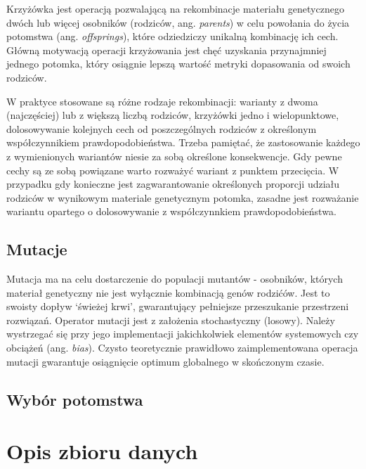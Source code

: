 \documentclass[a4paper,11pt]{article}
\begin{document}
    Krzyżówka jest operacją pozwalającą na rekombinacje materiału genetycznego dwóch lub więcej osobników (rodziców, ang. \textit{parents}) w celu powołania do życia potomstwa (ang. \textit{offsprings}), które odziedziczy unikalną kombinację ich cech. Główną motywacją operacji krzyżowania jest chęć uzyskania przynajmniej jednego potomka, który osiągnie lepszą wartość metryki dopasowania od swoich rodziców\cite{GeneticAlgorithmEssentials2017}.

    \bigskip

    W praktyce stosowane są różne rodzaje rekombinacji: warianty z dwoma (najczęściej) lub z większą liczbą rodziców, krzyżówki jedno i wielopunktowe, dolosowywanie kolejnych cech od poszczególnych rodziców z określonym współczynnikiem prawdopodobieństwa. Trzeba pamiętać, że zastosowanie każdego z wymienionych wariantów niesie za sobą określone konsekwencje. Gdy pewne cechy są ze sobą powiązane warto rozważyć wariant z punktem przecięcia. W przypadku gdy konieczne jest zagwarantowanie określonych proporcji udziału rodziców w wynikowym materiale genetycznym potomka, zasadne jest rozważanie wariantu opartego o dolosowywanie z współczynnkiem prawdopodobieństwa\cite{IntroductionToEvolutionaryComputing2015}.

    \subsection{Mutacje}

    Mutacja ma na celu dostarczenie do populacji mutantów - osobników, których materiał genetyczny nie jest wyłącznie kombinacją genów rodzićów. Jest to swoisty dopływ `świeżej krwi', gwarantujący pełniejsze przeszukanie przestrzeni rozwiązań. Operator mutacji jest z założenia stochastyczny (losowy). Należy wystrzegać się przy jego implementacji jakichkolwiek elementów systemowych czy obciążeń (ang. \textit{bias}). Czysto teoretycznie prawidłowo zaimplementowana operacja mutacji gwarantuje osiągnięcie optimum globalnego w skończonym czasie\cite{IntroductionToEvolutionaryComputing2015}.

    \subsection{Wybór potomstwa}


    \section{Opis zbioru danych}
\end{document}
